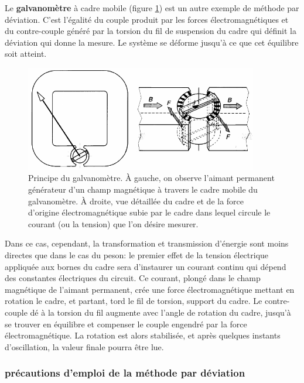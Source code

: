 \vspace{4mm}
Le \textbf{galvanomètre} à cadre mobile (figure \ref{fig:galva}) est un autre exemple de méthode par déviation. C'est l'égalité du couple produit par les forces électromagnétiques et du contre-couple généré par la torsion du fil de suspension du cadre qui définit la déviation qui donne la mesure. Le système se déforme jusqu'à ce que cet équilibre soit atteint.
\begin{figure}[h]
    \centering
    \includegraphics[height=4.6cm]{assets/figures/galva.pdf}
    \caption{Principe du galvanomètre. À gauche, on observe l'aimant permanent générateur d'un champ magnétique à travers le cadre mobile du galvanomètre. À droite, vue détaillée du cadre et de la force d'origine électromagnétique subie par le cadre dans lequel circule le courant (ou la tension) que l'on désire mesurer.}
    \label{fig:galva}
\end{figure}

Dans ce cas, cependant, la transformation et transmission d'énergie sont moins directes que dans le cas du peson: le premier effet de la tension électrique appliquée aux bornes du cadre sera d'instaurer un courant continu qui dépend des constantes électriques du circuit. Ce courant, plongé dans le champ magnétique de l'aimant permanent, crée une force électromagnétique mettant en rotation le cadre, et partant, tord le fil de torsion, support du cadre. Le contre-couple dé à la torsion du fil augmente avec l'angle de rotation du cadre, jusqu'à se trouver en équilibre et compenser le couple engendré par la force électromagnétique. La rotation est alors stabilisée, et après quelques instants d'oscillation, la valeur finale pourra être lue.

\subsubsection{précautions d'emploi de la méthode par déviation}

